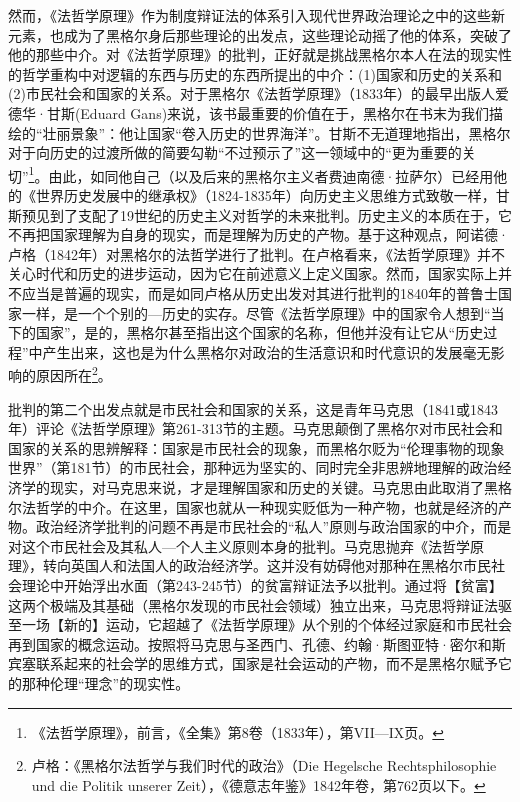 然而，《法哲学原理》作为制度辩证法的体系引入现代世界政治理论之中的这些新元素，也成为了黑格尔身后那些理论的出发点，这些理论动摇了他的体系，突破了他的那些中介。对《法哲学原理》的批判，正好就是挑战黑格尔本人在法的现实性的哲学重构中对逻辑的东西与历史的东西所提出的中介：(1)国家和历史的关系和(2)市民社会和国家的关系。对于黑格尔《法哲学原理》（1833年）的最早出版人爱德华·甘斯(Eduard Gans)来说，该书最重要的价值在于，黑格尔在书末为我们描绘的“壮丽景象”：他让国家“卷入历史的世界海洋”。甘斯不无道理地指出，黑格尔对于向历史的过渡所做的简要勾勒“不过预示了”这一领域中的“更为重要的关切”\footnote{《法哲学原理》，前言，《全集》第8卷（1833年），第VII—IX页。}。由此，如同他自己（以及后来的黑格尔主义者费迪南德·拉萨尔）已经用他的《世界历史发展中的继承权》（1824-1835年）向历史主义思维方式致敬一样，甘斯预见到了支配了19世纪的历史主义对哲学的未来批判。历史主义的本质在于，它不再把国家理解为自身的现实，而是理解为历史的产物。基于这种观点，阿诺德·卢格（1842年）对黑格尔的法哲学进行了批判。在卢格看来，《法哲学原理》并不关心时代和历史的进步运动，因为它在前述意义上定义国家。然而，国家实际上并不应当是普遍的现实，而是如同卢格从历史出发对其进行批判的1840年的普鲁士国家一样，是一个个别的—历史的实存。尽管《法哲学原理》中的国家令人想到“当下的国家”，是的，黑格尔甚至指出这个国家的名称，但他并没有让它从“历史过程”中产生出来，这也是为什么黑格尔对政治的生活意识和时代意识的发展毫无影响的原因所在\footnote{卢格：《黑格尔法哲学与我们时代的政治》（Die Hegelsche Rechtsphilosophie und die Politik unserer Zeit），《德意志年鉴》1842年卷，第762页以下。}。

批判的第二个出发点就是市民社会和国家的关系，这是青年马克思（1841或1843年）评论《法哲学原理》第261-313节的主题。马克思颠倒了黑格尔对市民社会和国家的关系的思辨解释：国家是市民社会的现象，而黑格尔贬为“伦理事物的现象世界”（第181节）的市民社会，那种远为坚实的、同时完全非思辨地理解的政治经济学的现实，对马克思来说，才是理解国家和历史的关键。马克思由此取消了黑格尔法哲学的中介。在这里，国家也就从一种现实贬低为一种产物，也就是经济的产物。政治经济学批判的问题不再是市民社会的“私人”原则与政治国家的中介，而是对这个市民社会及其私人—个人主义原则本身的批判。马克思抛弃《法哲学原理》，转向英国人和法国人的政治经济学。这并没有妨碍他对那种在黑格尔市民社会理论中开始浮出水面（第243-245节）的贫富辩证法予以批判。通过将【贫富】这两个极端及其基础（黑格尔发现的市民社会领域）独立出来，马克思将辩证法驱至一场【新的】运动，它超越了《法哲学原理》从个别的个体经过家庭和市民社会再到国家的概念运动。按照将马克思与圣西门、孔德、约翰·斯图亚特·密尔和斯宾塞联系起来的社会学的思维方式，国家是社会运动的产物，而不是黑格尔赋予它的那种伦理“理念”的现实性。

